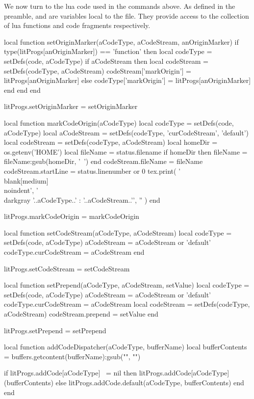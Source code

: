 We now turn to the lua code used in the \type{\directlua} commands above.
As defined in the preamble,  and  are variables
local to the  file. They provide access to the
collection of lua functions and code fragments respectively.

\startLuaCode
local function setOriginMarker(aCodeType, aCodeStream, anOriginMarker)
  if type(litProgs[anOriginMarker]) == 'function' then
    local codeType  = setDefs(code, aCodeType)
    if aCodeStream then
      local codeStream = setDefs(codeType, aCodeStream)
      codeStream['markOrigin'] = litProgs[anOriginMarker]
    else
      codeType['markOrigin'] = litProgs[anOriginMarker]
    end
  end
end

litProgs.setOriginMarker = setOriginMarker

local function markCodeOrigin(aCodeType)
  local codeType         = setDefs(code, aCodeType)
  local aCodeStream      = setDefs(codeType, 'curCodeStream', 'default')
  local codeStream       = setDefs(codeType, aCodeStream)
  local homeDir          = os.getenv('HOME')
  local fileName         = status.filename
  if homeDir then
    fileName = fileName:gsub(homeDir, '~')
  end
  codeStream.fileName    = fileName
  codeStream.startLine   = status.linenumber or 0
  tex.print({
   '\\blank[medium]\\noindent',
   '{\\darkgray '..aCodeType..' : '..aCodeStream..'}',
   ''
   })
end

litProgs.markCodeOrigin = markCodeOrigin

local function setCodeStream(aCodeType, aCodeStream)
  local codeType         = setDefs(code, aCodeType)
  aCodeStream            = aCodeStream or 'default'
  codeType.curCodeStream = aCodeStream
end

litProgs.setCodeStream = setCodeStream

local function setPrepend(aCodeType, aCodeStream, setValue)
  local codeType         = setDefs(code, aCodeType)
  aCodeStream            = aCodeStream or 'default'
  codeType.curCodeStream = aCodeStream
  local codeStream       = setDefs(codeType, aCodeStream)
  codeStream.prepend     = setValue
end

litProgs.setPrepend = setPrepend

local function addCodeDispatcher(aCodeType, bufferName)
  local bufferContents  =
    buffers.getcontent(bufferName):gsub("", "\n")

  if litProgs.addCode[aCodeType] ~= nil then
    litProgs.addCode[aCodeType](bufferContents)
  else
    litProgs.addCode.default(aCodeType, bufferContents)
  end
end

